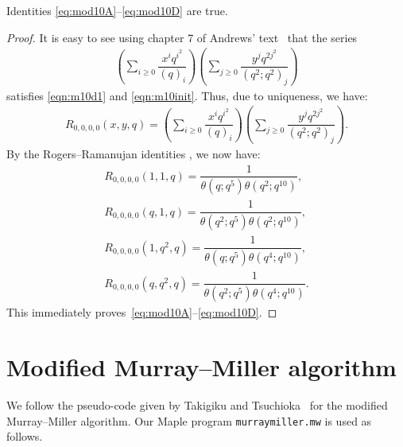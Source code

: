 \documentclass[ALCO,Unicode,published]{cedram}
\begin{document}
\begin{thm}
Identities \eqref{eq:mod10A}--\eqref{eq:mod10D} are true.
\end{thm}
\begin{proof}
It is easy to see using chapter 7 of Andrews' text~\cite{And-book} that 
the series  
\begin{align}
\left(\sum_{i\geq 0} \dfrac{x^iq^{i^2}}{(q)_i}\right)
\left(\sum_{j\geq 0} \dfrac{y^jq^{2j^2}}{(q^2;q^2)_j}\right)
\end{align}
satisfies \eqref{eqn:m10d1} and \eqref{eqn:m10init}.
Thus, due to uniqueness, we have:
\begin{align}
R_{0,0,0,0}(x,y,q)=\left(\sum_{i\geq 0} \dfrac{x^iq^{i^2}}{(q)_i}\right)
\left(\sum_{j\geq 0} \dfrac{y^jq^{2j^2}}{(q^2;q^2)_j}\right).
\end{align}
By the Rogers--Ramanujan identities \cite[Ch.\ 7]{And-book}, we now have:
\begin{align}
R_{0,0,0,0}(1,1,q)=\dfrac{1}{\theta(q;q^5)\theta(q^2;q^{10})},\\
R_{0,0,0,0}(q,1,q)=\dfrac{1}{\theta(q^2;q^5)\theta(q^2;q^{10})},\\
R_{0,0,0,0}(1,q^2,q)=\dfrac{1}{\theta(q;q^5)\theta(q^4;q^{10})},\\
R_{0,0,0,0}(q,q^2,q)=\dfrac{1}{\theta(q^2;q^5)\theta(q^4;q^{10})}.
\end{align}
This immediately proves~\eqref{eq:mod10A}--\eqref{eq:mod10D}.
\end{proof}

\appendix

\section{Modified Murray--Miller algorithm}
\label{sec:mmrec}
We follow the pseudo-code given by Takigiku and Tsuchioka~\cite{TakTsu-nandi} for the modified Murray--Miller algorithm.
Our Maple program \texttt{murraymiller.mw} is used as follows.
\end{document}
